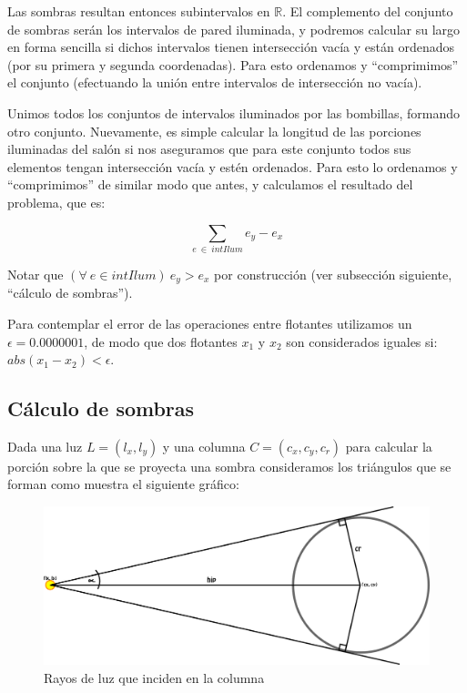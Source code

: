 Las sombras resultan entonces subintervalos en $\mathbb R$. El complemento del
conjunto de sombras serán los intervalos de pared iluminada, y podremos
calcular su largo en forma sencilla si dichos intervalos tienen intersección
vacía y están ordenados (por su primera y segunda coordenadas). Para esto
ordenamos y ``comprimimos'' el conjunto (efectuando la unión entre intervalos
de intersección no vacía).

Unimos todos los conjuntos de intervalos iluminados por las bombillas, formando otro conjunto.
Nuevamente, es simple calcular la longitud de las porciones iluminadas del salón si nos aseguramos que
para este conjunto todos sus elementos tengan intersección vacía y estén ordenados. Para esto lo
ordenamos y ``comprimimos'' de similar modo que antes, y calculamos el resultado del problema, que es:

\begin{center}
$$\sum_{e\ \in\ intIlum}e_y - e_x$$
\end{center}

Notar que $(\forall\ e \in intIlum)\ e_y > e_x$ por construcción (ver
subsección siguiente, ``cálculo de sombras'').

Para contemplar el error de las operaciones entre flotantes utilizamos un $\epsilon = 0.0000001$, 
de modo que dos flotantes $x_1$ y $x_2$ son considerados iguales si: $abs(x_1 - x_2) < \epsilon$.

\subsection*{Cálculo de sombras}
Dada una luz $L = (l_x, l_y)$ y una columna $C = (c_x, c_y, c_r)$ para calcular la porción sobre
la que se proyecta una sombra consideramos los triángulos que se forman como muestra el siguiente
gráfico:

\begin{figure}[H]
\centering
\label{bl_3}
\caption{\sc Rayos de luz que inciden en la columna}
\includegraphics[scale=1.0]{./figuras/bl_3.png}
\end{figure} 

